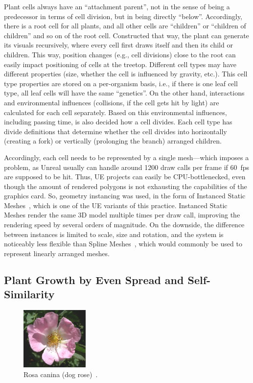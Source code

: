 \documentclass[11pt, abstract=on]{scrartcl}
\begin{document}
Plant cells always have an ``attachment parent'', not in the sense of being a predecessor in terms of cell division, but in being directly ``below''. Accordingly, there is a root cell for all plants, and all other cells are ``children'' or ``children of children'' and so on of the root cell. Constructed that way, the plant can generate its visuals recursively, where every cell first draws itself and then its child or children. This way, position changes (e.g., cell divisions) close to the root can easily impact positioning of cells at the treetop. Different cell types may have different properties (size, whether the cell is influenced by gravity, etc.). This cell type properties are stored on a per-organism basis, i.e., if there is one leaf cell type, all leaf cells will have the same ``genetics''. On the other hand, interactions and environmental influences (collisions, if the cell gets hit by light) are calculated for each cell separately. Based on this environmental influences, including passing time, is also decided how a cell divides. Each cell type has divide definitions that determine whether the cell divides into horizontally (creating a fork) or vertically (prolonging the branch) arranged children.

Accordingly, each cell needs to be represented by a single mesh---which imposes a problem, as Unreal usually can handle around 1200 draw calls per frame if 60~fps are supposed to be hit. Thus, UE projects can easily be CPU-bottlenecked, even though the amount of rendered polygons is not exhausting the capabilities of the graphics card. So, geometry instancing was used, in the form of Instanced Static Meshes~\cite{UEInstancing}, which is one of the UE variants of this practice. Instanced Static Meshes render the same 3D model multiple times per draw call, improving the rendering speed by several orders of magnitude. On the downside, the difference between instances is limited to scale, size and rotation, and the system is noticeably less flexible than Spline Meshes~\cite{UESplines}, which would commonly be used to represent linearly arranged meshes.

\subsection{Plant Growth by Even Spread and Self-Similarity} \label{cpt:EvenSelfSim}

\begin{figure} 
 	\centering
 		\includegraphics[width=0.3\textwidth]{Pic_DogRose.png}
 	\caption{Rosa canina (dog rose)~\cite{WikipediaDogRose}.}
 	\label{fig:DogRose}
\end{figure}
\end{document}

